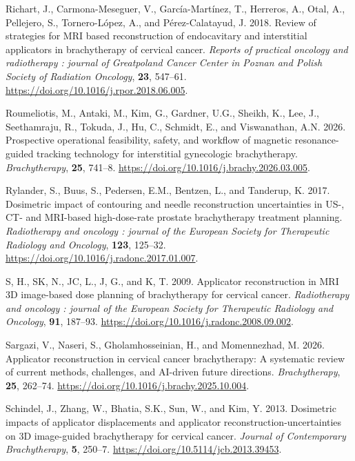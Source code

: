 \documentclass[
  11pt,
]{article}
\newlength{\cslhangindent}
\newenvironment{CSLReferences}[2] %
 {\begin{list}{}{%
  \setlength{\itemindent}{0pt}
  \setlength{\leftmargin}{0pt}
  \setlength{\parsep}{0pt}
  \ifodd #1
   \setlength{\leftmargin}{\cslhangindent}
   \setlength{\itemindent}{-1\cslhangindent}
  \fi
  \setlength{\itemsep}{#2\baselineskip}}}
 {\end{list}}
\begin{document}
\begin{CSLReferences}{1}{1}
Richart, J., Carmona-Meseguer, V., García-Martínez, T., Herreros, A.,
Otal, A., Pellejero, S., Tornero-López, A., and Pérez-Calatayud, J.
2018. Review of strategies for MRI based reconstruction of endocavitary
and interstitial applicators in brachytherapy of cervical cancer.
\emph{Reports of practical oncology and radiotherapy : journal of
Greatpoland Cancer Center in Poznan and Polish Society of Radiation
Oncology}, \textbf{23}, 547--61.
\url{https://doi.org/10.1016/j.rpor.2018.06.005}.

Roumeliotis, M., Antaki, M., Kim, G., Gardner, U.G., Sheikh, K., Lee,
J., Seethamraju, R., Tokuda, J., Hu, C., Schmidt, E., and Viswanathan,
A.N. 2026. Prospective operational feasibility, safety, and workflow of
magnetic resonance-guided tracking technology for interstitial
gynecologic brachytherapy. \emph{Brachytherapy}, \textbf{25}, 741--8.
\url{https://doi.org/10.1016/j.brachy.2026.03.005}.

Rylander, S., Buus, S., Pedersen, E.M., Bentzen, L., and Tanderup, K.
2017. Dosimetric impact of contouring and needle reconstruction
uncertainties in US-, CT- and MRI-based high-dose-rate prostate
brachytherapy treatment planning. \emph{Radiotherapy and oncology :
journal of the European Society for Therapeutic Radiology and Oncology},
\textbf{123}, 125--32.
\url{https://doi.org/10.1016/j.radonc.2017.01.007}.

S, H., SK, N., JC, L., J, G., and K, T. 2009. Applicator reconstruction
in MRI 3D image-based dose planning of brachytherapy for cervical
cancer. \emph{Radiotherapy and oncology : journal of the European
Society for Therapeutic Radiology and Oncology}, \textbf{91}, 187--93.
\url{https://doi.org/10.1016/j.radonc.2008.09.002}.

Sargazi, V., Naseri, S., Gholamhosseinian, H., and Momennezhad, M. 2026.
Applicator reconstruction in cervical cancer brachytherapy: A systematic
review of current methods, challenges, and {AI}-driven future
directions. \emph{Brachytherapy}, \textbf{25}, 262--74.
\url{https://doi.org/10.1016/j.brachy.2025.10.004}.

Schindel, J., Zhang, W., Bhatia, S.K., Sun, W., and Kim, Y. 2013.
Dosimetric impacts of applicator displacements and applicator
reconstruction-uncertainties on {3D} image-guided brachytherapy for
cervical cancer. \emph{Journal of Contemporary Brachytherapy},
\textbf{5}, 250--7. \url{https://doi.org/10.5114/jcb.2013.39453}.


\end{CSLReferences}
\end{document}
